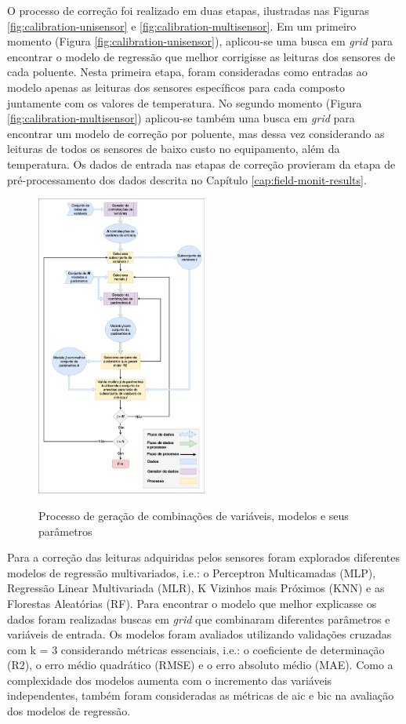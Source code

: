 O processo de correção foi realizado em duas etapas, ilustradas nas Figuras \ref{fig:calibration-unisensor} e \ref{fig:calibration-multisensor}. Em um primeiro momento (Figura \ref{fig:calibration-unisensor}), aplicou-se uma busca em \textit{grid} para encontrar o modelo de regressão que melhor corrigisse as leituras dos sensores de cada poluente. Nesta primeira etapa, foram consideradas como entradas ao modelo apenas as leituras dos sensores específicos para cada composto juntamente com os valores de temperatura. No segundo momento (Figura \ref{fig:calibration-multisensor}) aplicou-se também uma busca em \textit{grid} para encontrar um modelo de correção por poluente, mas dessa vez considerando as leituras de todos os sensores de baixo custo no equipamento, além da temperatura. Os dados de entrada nas etapas de correção provieram da etapa de pré-processamento dos dados descrita no Capítulo \ref{cap:field-monit-results}.

\begin{figure}[h!]
    \centering
    \caption{Processo de geração de combinações de variáveis, modelos e seus parâmetros}
    \includegraphics[width=0.5\textwidth]{chapters/4-CALIBRAÇÃO MÚLTIPLOS SENSORES/Figuras/Fluxograma busca em Grid.png}
    \label{fig:grid-search}
\end{figure}

Para a correção das leituras adquiridas pelos sensores foram explorados diferentes modelos de regressão multivariados, i.e.: o Perceptron Multicamadas (MLP), Regressão Linear Multivariada (MLR), K Vizinhos mais Próximos (KNN) e as Florestas Aleatórias (RF). Para encontrar o modelo que melhor explicasse os dados foram realizadas buscas em \textit{grid} que combinaram diferentes parâmetros e variáveis de entrada. Os modelos foram avaliados utilizando validações cruzadas com k = 3 considerando métricas essenciais, i.e.: o coeficiente de determinação (R2), o erro médio quadrático (RMSE) e o erro absoluto médio (MAE). Como a complexidade dos modelos aumenta com o incremento das variáveis independentes, também foram consideradas as métricas de \acrshort{aic} e \acrshort{bic} na avaliação dos modelos de regressão.

